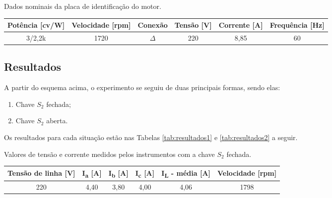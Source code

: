 \documentclass[a4paper,12pt,oneside]{article}
\begin{document}
\begin{scriptsize}
\begin{center}
\renewcommand{\arraystretch}{1.5}
\captionsetup{type=table}
\caption{Dados nominais da placa de identificação do motor.}\vspace{2mm}
\begin{tabular}{c|c|c|c|c|c}\label{tab:dados}
\textbf{Potência [cv/W]} & \textbf{Velocidade [rpm]} & \textbf{Conexão} & \textbf{Tensão [V]} & \textbf{Corrente [A]} & \textbf{Frequência [Hz]}\\ \hline
3/2,2k & 1720 & $\Delta$ & 220 & 8,85 & 60\\ \hline
\end{tabular}
\end{center}
\end{scriptsize}

\newpage
\subsection{Resultados}

\renewcommand{\labelenumi}{$\textbf{\textcolor{Azul}{\arabic{enumi}.}}$}

A partir do esquema acima, o experimento se seguiu de duas principais formas, sendo elas:

\begin{enumerate}
\item Chave $S_2$ fechada;
\item Chave $S_2$ aberta.
\end{enumerate}


Os resultados para cada situação estão nas Tabelas \ref{tab:resultados1} e \ref{tab:resultados2} a seguir.


\begin{center}
\renewcommand{\arraystretch}{1.5}
\captionsetup{type=table}
\caption{Valores de tensão e corrente medidos pelos instrumentos com a chave $S_2$ fechada.}\vspace{2mm}
\begin{tabular}{c|c|c|c|c|c}\label{tab:resultados1}
\textbf{Tensão de linha [V]} & \textbf{I\textsubscript{a} [A]} & \textbf{I\textsubscript{b} [A]} & \textbf{I\textsubscript{c} [A]} & \textbf{I\textsubscript{L} - média [A]} & \textbf{Velocidade [rpm]}\\ \hline
220 & 4,40 & 3,80 & 4,00 & 4,06 & 1798\\ \hline
\end{tabular}
\end{center}
\end{document}
